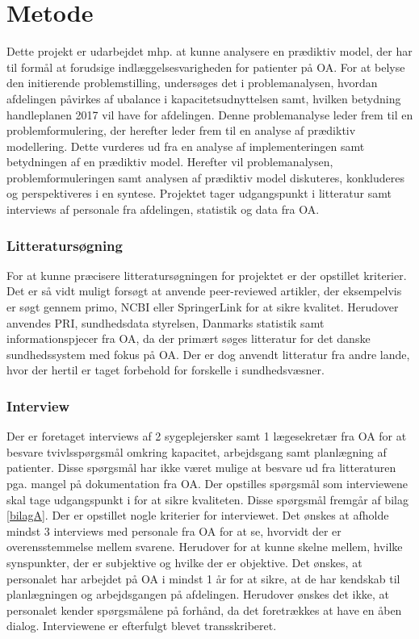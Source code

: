\chapter{Metode}
Dette projekt er udarbejdet mhp. at kunne analysere en prædiktiv model, der har til formål at forudsige indlæggelsesvarigheden for patienter på OA. For at belyse den initierende problemstilling, undersøges det i problemanalysen, hvordan afdelingen påvirkes af ubalance i kapacitetsudnyttelsen samt, hvilken betydning handleplanen 2017 vil have for afdelingen. Denne problemanalyse leder frem til en problemformulering, der herefter leder frem til en analyse af prædiktiv modellering. Dette vurderes ud fra en analyse af implementeringen samt betydningen af en prædiktiv model. Herefter vil problemanalysen, problemformuleringen samt analysen af prædiktiv model diskuteres, konkluderes og perspektiveres i en syntese. Projektet tager udgangspunkt i litteratur samt interviews af personale fra afdelingen, statistik og data fra OA. 


\subsection{Litteratursøgning}
For at kunne præcisere litteratursøgningen for projektet er der opstillet kriterier. Det er så vidt muligt forsøgt at anvende peer-reviewed artikler, der eksempelvis er søgt gennem primo, NCBI eller SpringerLink for at sikre kvalitet. Herudover anvendes PRI, sundhedsdata styrelsen, Danmarks statistik samt informationspjecer fra OA, da der primært søges litteratur for det danske sundhedssystem med fokus på OA. Der er dog anvendt litteratur fra andre lande, hvor der hertil er taget forbehold for forskelle i sundhedsvæsner.


\subsection{Interview}
Der er foretaget interviews af 2 sygeplejersker samt 1 lægesekretær fra OA for at besvare tvivlsspørgsmål omkring kapacitet, arbejdsgang samt planlægning af patienter. Disse spørgsmål har ikke været mulige at besvare ud fra litteraturen pga. mangel på dokumentation fra OA. Der opstilles spørgsmål som interviewene skal tage udgangspunkt i for at sikre kvaliteten. Disse spørgsmål fremgår af bilag \ref{bilagA}. Der er opstillet nogle kriterier for interviewet. Det ønskes at afholde mindst 3 interviews med personale fra OA for at se, hvorvidt der er overensstemmelse mellem svarene. Herudover for at kunne skelne mellem, hvilke synspunkter, der er subjektive og hvilke der er objektive. Det ønskes, at personalet har arbejdet på OA i mindst 1 år for at sikre, at de har kendskab til planlægningen og arbejdsgangen på afdelingen. Herudover ønskes det ikke, at personalet kender spørgsmålene på forhånd, da det foretrækkes at have en åben dialog. Interviewene er efterfulgt blevet transskriberet.



